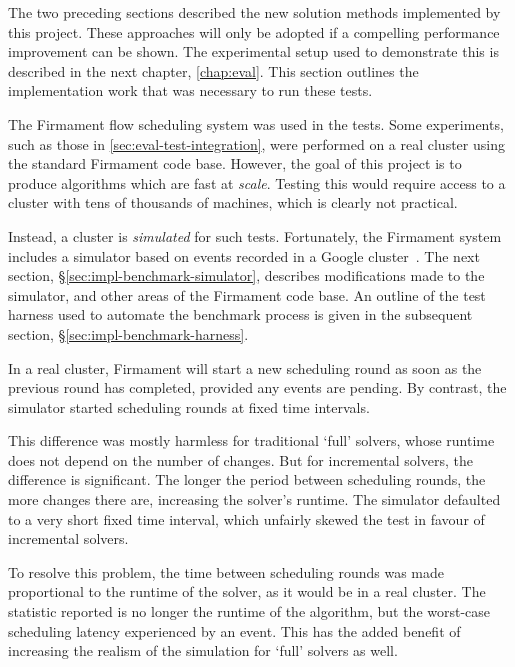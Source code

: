 
The two preceding sections described the new solution methods implemented by this project. These approaches will only be adopted if a compelling performance improvement can be shown. The experimental setup used to demonstrate this is described in the next chapter, \cref{chap:eval}. This section outlines the implementation work that was necessary to run these tests.

The Firmament flow scheduling system was used in the tests. Some experiments, such as those in \cref{sec:eval-test-integration}, were performed on a real cluster using the standard Firmament code base. However, the goal of this project is to produce algorithms which are fast at \emph{scale}. Testing this would require access to a cluster with tens of thousands of machines, which is clearly not practical.

Instead, a cluster is \emph{simulated} for such tests. Fortunately, the Firmament system includes a simulator based on events recorded in a Google cluster~\cite{clusterdata:Wilkes2011}. The next section, \S\ref{sec:impl-benchmark-simulator}, describes modifications made to the simulator, and other areas of the Firmament code base. An outline of the test harness used to automate the benchmark process is given in the subsequent section, \S\ref{sec:impl-benchmark-harness}.

In a real cluster, Firmament will start a new scheduling round as soon as the previous round has completed, provided any events are pending. By contrast, the simulator started scheduling rounds at fixed time intervals. 

This difference was mostly harmless for traditional `full' solvers, whose runtime does not depend on the number of changes.  But for incremental solvers, the difference is significant. The longer the period between scheduling rounds, the more changes there are, increasing the solver's runtime. The simulator defaulted to a very short fixed time interval, which unfairly skewed the test in favour of incremental solvers. 

To resolve this problem, the time between scheduling rounds was made proportional to the runtime of the solver, as it would be in a real cluster. The statistic reported is no longer the runtime of the algorithm, but the worst-case scheduling latency experienced by an event\footnotemark. This has the added benefit of increasing the realism of the simulation for `full' solvers as well.

